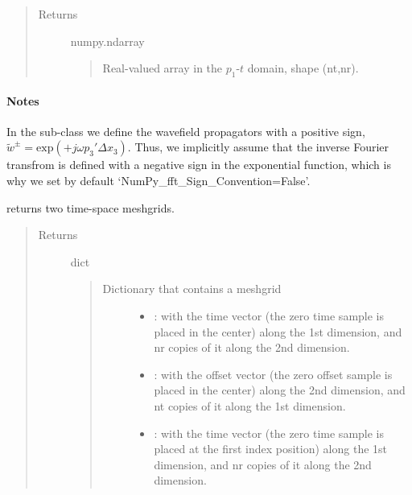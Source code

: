 \documentclass[letterpaper,10pt,english]{sphinxmanual}
\begin{document}
\begin{fulllineitems}
\begin{fulllineitems}
\begin{quote}
\begin{description}
\item[{Returns}] \leavevmode
numpy.ndarray
\begin{quote}

Real-valued array in the \(p_1\)-\(t\) domain, shape (nt,nr).
\end{quote}

\end{description}\end{quote}
\paragraph{Notes}

In the sub-class  we define the wavefield propagators with a positive sign, \(\tilde{w}^{\pm} = \mathrm{exp}(+j \omega p_3' \Delta x_3)\). Thus, we implicitly assume that the inverse Fourier transfrom is defined with a negative sign in the exponential function, which is why we set by default ‘NumPy\_fft\_Sign\_Convention=False’.

\end{fulllineitems}


\begin{fulllineitems}
\label{\detokenize{Wavefield_NRM_p_w:Wavefield_NRM_p_w.Wavefield_NRM_p_w.T_X_grid}}
returns two time-space meshgrids.
\begin{quote}\begin{description}
\item[{Returns}] \leavevmode
dict
\begin{quote}
\begin{description}
\item[{Dictionary that contains a meshgrid}] \leavevmode\begin{itemize}
\item {} 
: with the time vector  (the zero time sample is placed in the center) along the 1st dimension, and nr copies of it along the 2nd dimension.

\item {} 
: with the offset vector  (the zero offset sample is placed in the center) along the 2nd dimension, and nt copies of it along the 1st dimension.

\item {} 
: with the time vector  (the zero time sample is placed at the first index position) along the 1st dimension, and nr copies of it along the 2nd dimension.


\end{itemize}
\end{description}
\end{quote}
\end{description}
\end{quote}
\end{fulllineitems}
\end{fulllineitems}
\end{document}
